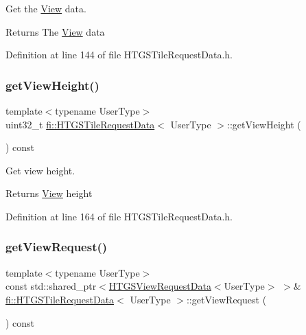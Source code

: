 Get the \hyperlink{classfi_1_1View}{View} data. 

\begin{DoxyReturn}{Returns}
The \hyperlink{classfi_1_1View}{View} data 
\end{DoxyReturn}


Definition at line 144 of file H\+T\+G\+S\+Tile\+Request\+Data.\+h.

\mbox{\label{classfi_1_1HTGSTileRequestData_adbdf59944b03ab3c42c48db52ca8a555}} 
\subsubsection{\texorpdfstring{get\+View\+Height()}{getViewHeight()}}
{\footnotesize\ttfamily template$<$typename User\+Type$>$ \\
uint32\+\_\+t \hyperlink{classfi_1_1HTGSTileRequestData}{fi\+::\+H\+T\+G\+S\+Tile\+Request\+Data}$<$ User\+Type $>$\+::get\+View\+Height (\begin{DoxyParamCaption}{ }\end{DoxyParamCaption}) const\hspace{0.3cm}{\ttfamily [inline]}}



Get view height. 

\begin{DoxyReturn}{Returns}
\hyperlink{classfi_1_1View}{View} height 
\end{DoxyReturn}


Definition at line 164 of file H\+T\+G\+S\+Tile\+Request\+Data.\+h.

\mbox{\label{classfi_1_1HTGSTileRequestData_a88e1a31faeb84ccd305114b30f55c91b}} 
\subsubsection{\texorpdfstring{get\+View\+Request()}{getViewRequest()}}
{\footnotesize\ttfamily template$<$typename User\+Type$>$ \\
const std\+::shared\+\_\+ptr$<$\hyperlink{classfi_1_1HTGSViewRequestData}{H\+T\+G\+S\+View\+Request\+Data}$<$User\+Type$>$ $>$\& \hyperlink{classfi_1_1HTGSTileRequestData}{fi\+::\+H\+T\+G\+S\+Tile\+Request\+Data}$<$ User\+Type $>$\+::get\+View\+Request (\begin{DoxyParamCaption}{ }\end{DoxyParamCaption}) const\hspace{0.3cm}{\ttfamily [inline]}}



